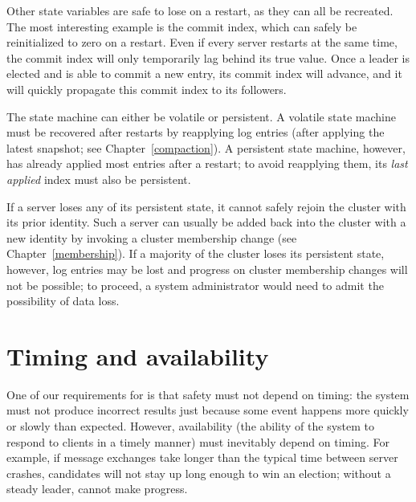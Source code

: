 Other state variables are safe to lose on a restart, as they can all be
recreated.
The most interesting example is the commit index, which can safely be
reinitialized to zero on a restart. Even if every server restarts at the
same time, the commit index will only temporarily lag behind its true
value. Once a leader is elected and is able to commit a new entry, its
commit index will advance, and it will quickly propagate this commit
index to its followers.

The state machine can either be volatile or persistent. A volatile state
machine must be recovered after restarts by reapplying log entries
(after applying the latest snapshot; see Chapter~\ref{compaction}). A
persistent state machine, however, has already applied most entries
after a restart; to avoid reapplying them, its \emph{last applied} index
must also be persistent.

If a server loses any of its persistent state, it cannot safely rejoin
the cluster with its prior identity. Such a server can
usually be added back into the cluster with a new identity by invoking a
cluster membership change (see Chapter~\ref{membership}). If a majority
of the cluster loses its persistent state, however, log entries may be
lost and progress on cluster membership changes will not be possible; to
proceed, a system administrator would need to admit the possibility of
data loss.

\section{Timing and availability}
\label{basicraft:timing}

One of our requirements for \name{} is that safety must not depend
on timing: the system must not produce incorrect results just because
some event happens more quickly or slowly than expected. However,
availability (the ability of the system to respond to clients in a
timely manner) must
inevitably depend on timing. For example, if message exchanges take
longer than the typical time between server crashes, candidates will
not stay up long enough to win an election; without a steady leader,
\name{} cannot make progress.


